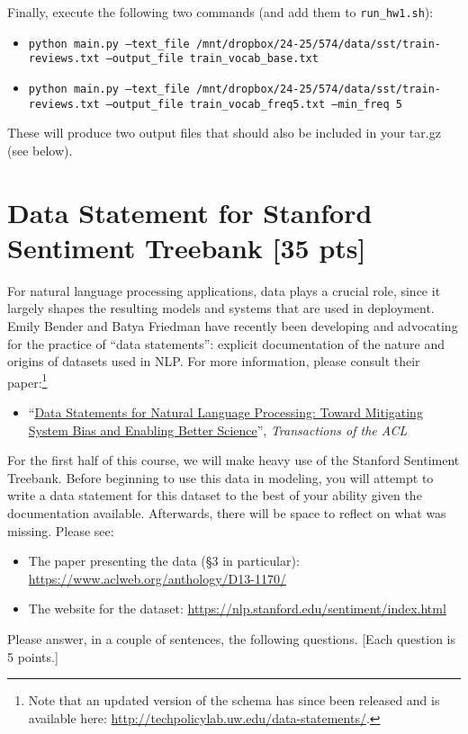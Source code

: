 \documentclass[11pt]{article}
\begin{document}
\vspace{2em}
  Finally, execute the following two commands (and add them to \texttt{run\_hw1.sh}):
\begin{itemize}
  \item \texttt{python main.py --text\_file /mnt/dropbox/24-25/574/data/sst/train-reviews.txt --output\_file train\_vocab\_base.txt}
  \item \texttt{python main.py --text\_file /mnt/dropbox/24-25/574/data/sst/train-reviews.txt --output\_file train\_vocab\_freq5.txt --min\_freq 5}
\end{itemize}
These will produce two output files that should also be included in your tar.gz (see below).


\section{Data Statement for Stanford Sentiment Treebank [35 pts]}

For natural language processing applications, data plays a crucial role, since it largely shapes the resulting models and systems that are used in deployment.  Emily Bender and Batya Friedman have recently been developing and advocating for the practice of ``data statements'': explicit documentation of the nature and origins of datasets used in NLP.  For more information, please consult their paper:\footnote{Note that an updated version of the schema has since been released and is available here: \url{http://techpolicylab.uw.edu/data-statements/}.}
\begin{itemize}
  \item ``\href{https://www.aclweb.org/anthology/Q18-1041/}{Data Statements for Natural Language Processing: Toward Mitigating System Bias and Enabling Better Science}'', \emph{Transactions of the ACL}
\end{itemize}
For the first half of this course, we will make heavy use of the Stanford Sentiment Treebank.  Before beginning to use this data in modeling, you will attempt to write a data statement for this dataset to the best of your ability given the documentation available.  Afterwards, there will be space to reflect on what was missing. Please see:
\begin{itemize}
  \item The paper presenting the data (\S3 in particular): \url{https://www.aclweb.org/anthology/D13-1170/}
  \item The website for the dataset: \url{https://nlp.stanford.edu/sentiment/index.html}
\end{itemize}
Please answer, in a couple of sentences, the following questions. [Each question is 5 points.]
\end{document}
